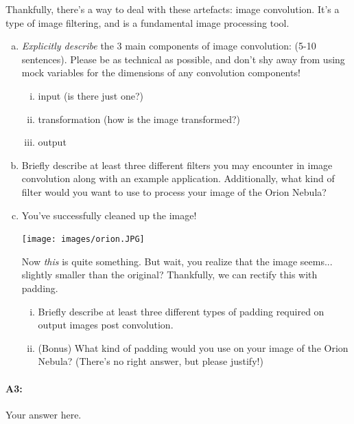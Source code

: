 Thankfully, there's a way to deal with these artefacts: image convolution. It's a type of image filtering, and is a fundamental image processing tool.

\begin{enumerate}[(a)]
\item \emph{Explicitly describe} the 3 main components of image convolution: (5-10 sentences). Please be as technical as possible, and don't shy away from using mock variables for the dimensions of any convolution components!
\begin{enumerate}[(i)]
    \item input (is there just one?)
    \item transformation (how is the image transformed?)
    \item output
\end{enumerate}

\item Briefly describe at least three different filters you may encounter in image convolution along with an example application. Additionally, what kind of filter would you want to use to process your image of the Orion Nebula? 

\item
You've successfully cleaned up the image!

\texttt{[image: images/orion.JPG]}

Now \textit{this} is quite something. But wait, you realize that the image seems... slightly smaller than the original? Thankfully, we can rectify this with padding.
\begin{enumerate}[(i)]
    \item Briefly describe at least three different types of padding required on output images post convolution. 
    \item (Bonus) What kind of padding would you use on your image of the Orion Nebula? (There's no right answer, but please justify!)
\end{enumerate}

\end{enumerate}


\pagebreak
\paragraph{A3:} Your answer here.


